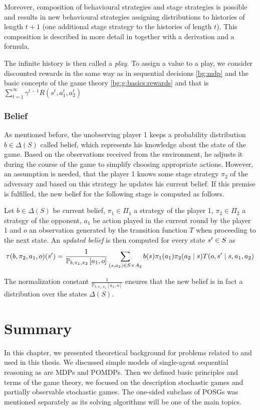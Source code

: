 \documentclass[../main.tex]{subfiles}
\begin{document}
Moreover, composition of behavioural strategies and stage strategies is possible and results in new behavioural strategies assigning distributions to histories of length $t + 1$ (one additional stage strategy to the histories of length $t$).
This composition is described in more detail in \cite{poposgsthesis} together with a derivation and a formula.

The infinite history is then called a \textit{play}.
To assign a value to a play, we consider discounted rewards in the same way as in sequential decisions \ref{bg:mdp} and the basic concepts of the game theory \ref{bg:g:basics:rewards} and that is $\sum_{t = 1}^{\infty} \gamma^{t - 1} R(s^t, a_1^t, a_2^t)$

\subsubsection{Belief}\label{bg:osposg:model:belief}
As mentioned before, the unobserving player 1 keeps a probability distribution $b \in \Delta(S)$ called belief, which represents his knowledge about the state of the game.
Based on the observations received from the environment, he adjusts it during the course of the game to simplify choosing appropriate actions.
However, an assumption is needed, that the player 1 knows some stage strategy $\pi_2$ of the adversary and based on this strategy he updates his current belief.
If this premise is fulfilled, the new belief for the following stage is computed as follows.
\begin{definition}\label{bg:osposg:model:belief:update}
    Let $b \in \Delta(S)$ be current belief, $\pi_1 \in \Pi_1$ a strategy of the player 1, $\pi_2 \in \Pi_2$ a strategy of the opponent, $a_1$ be action played in the current round by the player 1 and $o$ an observation generated by the transition function $T$ when proceeding to the next state.
    An \textit{updated belief} is then computed for every state $s^{\prime} \in S$ as
    \begin{equation}
        \tau(b, \pi_2, a_1, o)(s^{\prime}) = \frac{1}{\mathbb{P}_{b, \pi_1, \pi_2}\left[a_1, o\right]}\sum_{\left(s, a_2\right) \in S \times A_2} b(s) \pi_1(a_1)  \pi_2(a_2 \mid s) T(o, s^{\prime} \mid s, a_1, a_2)
    \end{equation}
\end{definition}
The normalization constant $\frac{1}{\mathbb{P}_{b, \pi_1, \pi_2}\left[a_1, o\right]}$ ensures that the new belief is in fact a distribution over the states $\Delta(S)$.

\section{Summary}\label{bg:summary}
In this chapter, we presented theoretical background for problems related to and used in this thesis.
We discussed simple models of single-agent sequential reasoning as are MDPs and POMDPs.
Then we defined basic principles and terms of the game theory, we focused on the description stochastic games and partially observable stochastic games.
The one-sided subclass of POSGs was mentioned separately as its solving algorithms will be one of the main topics.
\end{document}
